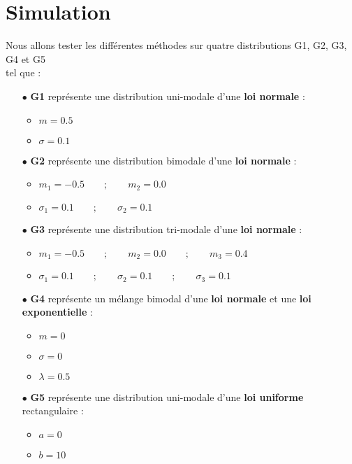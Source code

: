 \section{Simulation}
Nous allons tester les différentes méthodes sur quatre distributions G1, G2, G3, G4 et G5 \\ tel que :
\newline
\begin{itemize}
 \setlength\itemsep{12pt}
    \item[$\bullet$]\textbf{G1} représente une distribution uni-modale d’une \textbf{loi normale} :
    \begin{itemize}
    \item $m = 0.5$
    \item $\sigma = 0.1$
    \end{itemize}

    \item[$\bullet$]\textbf{G2} représente une distribution bimodale d’une \textbf{loi normale} :
    \begin{itemize}
    \item $m_1 = -0.5\qquad ; \qquad m_2 = 0.0$
    \item $\sigma_1 = 0.1 \qquad ; \qquad \sigma_2 = 0.1$
    \end{itemize}


        \item[$\bullet$]\textbf{G3} représente une distribution tri-modale d’une \textbf{loi normale} :
    \begin{itemize}
    \item $m_1 = -0.5\qquad ; \qquad m_2 = 0.0 \qquad ; \qquad m_3 = 0.4$
    \item $\sigma_1 = 0.1 \qquad ; \qquad \sigma_2 = 0.1 \qquad ; \qquad \sigma_3 = 0.1 $
    \end{itemize}


        \item[$\bullet$]\textbf{G4} représente un mélange bimodal d’une \textbf{loi normale} et une \textbf{loi exponentielle} :
    \begin{itemize}
    \item $m = 0$
    \item $\sigma = 0$
    \item $\lambda = 0.5$
    \end{itemize}

         \item[$\bullet$]\textbf{G5} représente une distribution uni-modale d’une \textbf{loi uniforme} rectangulaire :
    \begin{itemize}
    \item $a = 0$
    \item $b = 10$
    \end{itemize}

\end{itemize}

